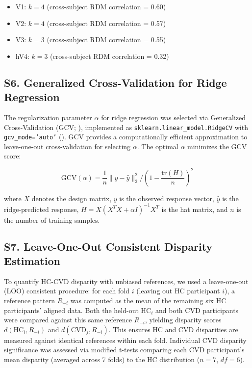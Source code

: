 \begin{itemize}
\item V1: $k = 4$ (cross-subject RDM correlation = 0.60)
\item V2: $k = 4$ (cross-subject RDM correlation = 0.57)
\item V3: $k = 3$ (cross-subject RDM correlation = 0.55)
\item hV4: $k = 3$ (cross-subject RDM correlation = 0.32)
\end{itemize}



\subsection*{\textbf{S6. Generalized Cross-Validation for Ridge Regression}}
\label{app:gcv}

The regularization parameter $\alpha$ for ridge regression was selected via Generalized Cross-Validation (GCV; ), implemented as \texttt{sklearn.linear\_model.RidgeCV} with \texttt{gcv\_mode='auto'} ().
GCV provides a computationally efficient approximation to leave-one-out cross-validation for selecting $\alpha$.
The optimal $\alpha$ minimizes the GCV score:

\begin{equation}
\text{GCV}(\alpha) = \frac{1}{n} \|y - \hat{y}\|_2^2 / \left(1 - \frac{\text{tr}(H)}{n}\right)^2
\end{equation}

where $X$ denotes the design matrix, $y$ is the observed response vector, $\hat{y}$ is the ridge-predicted response, $H = X(X^T X + \alpha I)^{-1}X^T$ is the hat matrix, and $n$ is the number of training samples.



\subsection*{\textbf{S7. Leave-One-Out Consistent Disparity Estimation}}

To quantify HC-CVD disparity with unbiased references, we used a leave-one-out (LOO) consistent procedure: for each fold $i$ (leaving out HC participant $i$), a reference pattern $R_{-i}$ was computed as the mean of the remaining six HC participants' aligned data.
Both the held-out $\text{HC}_i$ and both CVD participants were compared against this same reference $R_{-i}$, yielding disparity scores $d(\text{HC}_i, R_{-i})$ and $d(\text{CVD}_j, R_{-i})$.
This ensures HC and CVD disparities are measured against identical references within each fold.
Individual CVD disparity significance was assessed via  modified t-tests comparing each CVD participant's mean disparity (averaged across 7 folds) to the HC distribution ($n=7$, $df=6$).

